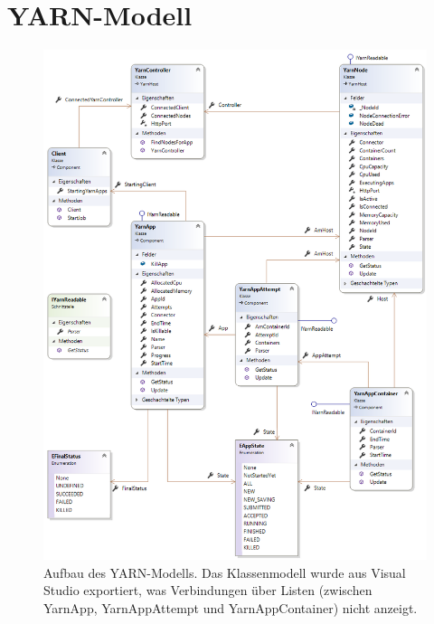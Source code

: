 \section{YARN-Modell}\label{sec:yarnModel}

\begin{figure}
	\centering
	\includegraphics[width=\columnwidth]{./images/yarnModel.png}
	\caption[Aufbau des YARN-Modells]{Aufbau des YARN-Modells. Das Klassenmodell wurde aus Visual Studio exportiert, was Verbindungen über Listen (zwischen YarnApp, YarnAppAttempt und YarnAppContainer) nicht anzeigt.}
	\label{fig:hdfsarch}
\end{figure}
